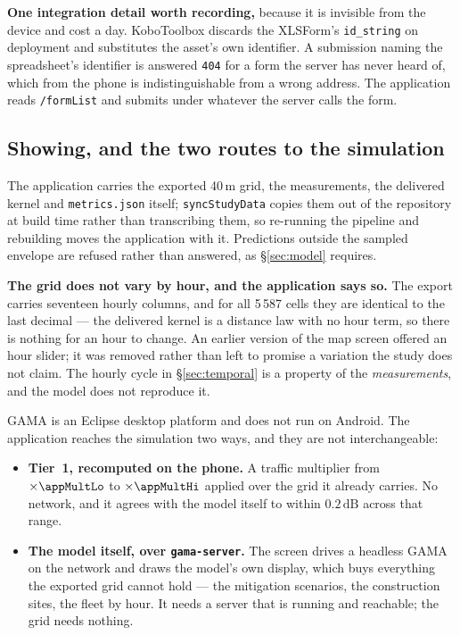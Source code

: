 \documentclass[11pt,a4paper]{article}
\newcommand{\dB}{\ensuremath{\,\mathrm{dB}}}
\begin{document}
\medskip\noindent
\textbf{One integration detail worth recording,} because it is invisible from the
device and cost a day. KoboToolbox discards the XLSForm's \texttt{id\_string} on
deployment and substitutes the asset's own identifier. A submission naming the
spreadsheet's identifier is answered \texttt{404} for a form the server has never
heard of, which from the phone is indistinguishable from a wrong address. The
application reads \texttt{/formList} and submits under whatever the server calls
the form.

\subsection{Showing, and the two routes to the simulation}

The application carries the exported 40\,m grid, the \nMeas{} measurements, the
delivered kernel and \texttt{metrics.json} itself; \texttt{syncStudyData} copies
them out of the repository at build time rather than transcribing them, so
re-running the pipeline and rebuilding moves the application with it. Predictions
outside the sampled envelope are refused rather than answered, as
\S\ref{sec:model} requires.

\medskip\noindent
\textbf{The grid does not vary by hour, and the application says so.} The export
carries seventeen hourly columns, and for all 5\,587 cells they are identical to
the last decimal --- the delivered kernel is a distance law with no hour term, so
there is nothing for an hour to change. An earlier version of the map screen
offered an hour slider; it was removed rather than left to promise a variation
the study does not claim. The hourly cycle in \S\ref{sec:temporal} is a property
of the \emph{measurements}, and the model does not reproduce it.

\medskip\noindent
GAMA is an Eclipse desktop platform and does not run on Android. The application
reaches the simulation two ways, and they are not interchangeable:

\begin{itemize}
  \item \textbf{Tier~1, recomputed on the phone.} A traffic multiplier from
        $\times\appMultLo$ to $\times\appMultHi$ applied over the grid it already
        carries. No network, and it agrees with the model itself to within
        $0.2\dB$ across that range.
  \item \textbf{The model itself, over \texttt{gama-server}.} The screen drives a
        headless GAMA on the network and draws the model's own display, which
        buys everything the exported grid cannot hold --- the mitigation
        scenarios, the construction sites, the fleet by hour. It needs a server
        that is running and reachable; the grid needs nothing.
\end{itemize}
\end{document}
